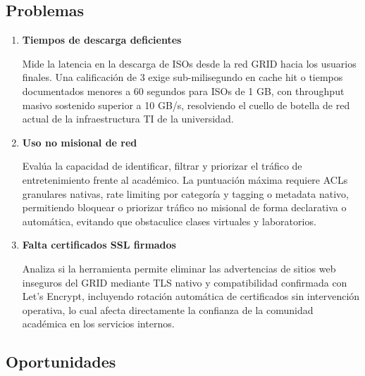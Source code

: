 \subsection{Problemas}

\begin{enumerate}[resume*=criterios]
  \item \textbf{Tiempos de descarga deficientes}

  Mide la latencia en la descarga de ISOs desde la red GRID hacia los usuarios finales. Una calificación de 3 exige sub-milisegundo en cache hit o tiempos documentados menores a 60 segundos para ISOs de 1 GB, con throughput masivo sostenido superior a 10 GB/s, resolviendo el cuello de botella de red actual de la infraestructura TI de la universidad.

  \item \textbf{Uso no misional de red}

  Evalúa la capacidad de identificar, filtrar y priorizar el tráfico de entretenimiento frente al académico. La puntuación máxima requiere ACLs granulares nativas, rate limiting por categoría y tagging o metadata nativo, permitiendo bloquear o priorizar tráfico no misional de forma declarativa o automática, evitando que obstaculice clases virtuales y laboratorios.

  \item \textbf{Falta certificados SSL firmados}

  Analiza si la herramienta permite eliminar las advertencias de sitios web inseguros del GRID mediante TLS nativo y compatibilidad confirmada con Let's Encrypt, incluyendo rotación automática de certificados sin intervención operativa, lo cual afecta directamente la confianza de la comunidad académica en los servicios internos.

\end{enumerate}

\subsection{Oportunidades}

